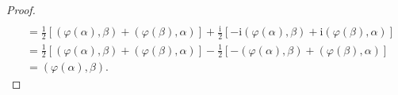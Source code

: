\documentclass[../../main.tex]{subfiles}
\begin{document}
\begin{proof}
\begin{align*}
\\
&=\frac{1}{2}\left[ \left( \varphi \left( \alpha \right) ,\beta \right) +\left( \varphi \left( \beta \right) ,\alpha \right) \right] +\frac{\mathrm{i}}{2}\left[ -\mathrm{i}\left( \varphi \left( \alpha \right) ,\beta \right) +\mathrm{i}\left( \varphi \left( \beta \right) ,\alpha \right) \right] 
\\
&=\frac{1}{2}\left[ \left( \varphi \left( \alpha \right) ,\beta \right) +\left( \varphi \left( \beta \right) ,\alpha \right) \right] -\frac{1}{2}\left[ -\left( \varphi \left( \alpha \right) ,\beta \right) +\left( \varphi \left( \beta \right) ,\alpha \right) \right] 
\\
&=\left( \varphi \left( \alpha \right) ,\beta \right) .
\end{align*}

\end{proof}
\end{document}
